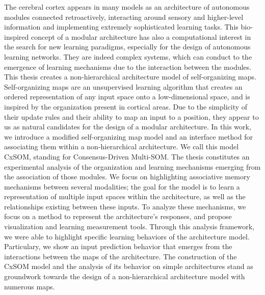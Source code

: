 \documentclass[11pt]{thesul-cs}
\begin{document}
\begin{ThesisAbstract}
\begin{FrenchAbstract}
  \end{FrenchAbstract}

  \begin{EnglishAbstract}
The cerebral cortex appears in many models as an architecture of autonomous modules connected retroactively, interacting around sensory and higher-level information and implementing extremely sophisticated learning tasks. 
This bio-inspired concept of a modular architecture has also a computational interest in the search for new learning paradigms, especially for the design of autonomous learning networks. They are indeed complex systems, which can conduct to the emergence of learning mechanisms due to the interaction between the modules.
This thesis creates a non-hierarchical architecture model of self-organizing maps.
Self-organizing maps are an unsupervised learning algorithm that creates an ordered representation of any input space onto a low-dimensional space, and is inspired by the organization present in cortical areas. 
Due to the simplicity of their update rules and their ability to map an input to a position, they appear to us as natural candidates for the design of a modular architecture.
In this work, we introduce a modified self-organizing map model and an interface method for associating them within a non-hierarchical architecture. We call this model CxSOM, standing for Consensus-Driven Multi-SOM.
The thesis constitutes an experimental analysis of the organization and learning mechanisms emerging from the association of those modules. 
We focus on highlighting associative memory mechanisms between several modalities; the goal for the model is to learn a representation of multiple input spaces within the architecture, as well as the relationships existing between these inputs.
To analyze these mechanisms, we focus on a method to represent the architecture's responses, and propose visualization and learning measurement tools. Through this analysis framework, we were able to highlight specific learning behaviors of the architecture model. Particulary, we show an input prediction behavior that emerges from the interactions between the maps of the architecture.
The construction of the CxSOM model and the analysis of its behavior on simple architectures stand as groundwork towards the design of a non-hierarchical architecture model with numerous maps.
   
    \end{EnglishAbstract}
  \end{ThesisAbstract}

\setcounter{tocdepth}{1}
\tableofcontents

\mainmatter










 \printbibliography
\end{document}
